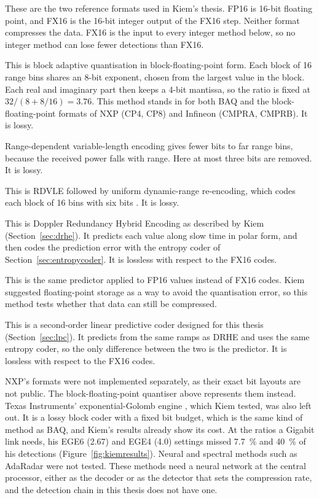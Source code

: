 \begin{description}[leftmargin=!,labelwidth=26mm,style=nextline,font=\normalfont\bfseries]
\item[FP16, FX16] These are the two reference formats used in Kiem's thesis.
FP16 is 16-bit floating point, and FX16 is the 16-bit integer output of the
FX16 step. Neither format compresses the data. FX16 is the input to every
integer method below, so no integer method can lose fewer detections than FX16.
\item[BAQ] This is block adaptive quantisation in block-floating-point form.
Each block of 16 range bins shares an 8-bit exponent, chosen from the largest
value in the block. Each real and imaginary part then keeps a 4-bit mantissa,
so the ratio is fixed at $32/(8 + 8/16) = 3.76$. This method stands in for
both BAQ \cite{kwok1989} and the block-floating-point formats of NXP (CP4,
CP8) and Infineon (CMPRA, CMPRB). It is lossy.
\item[RDVLE] Range-dependent variable-length encoding \cite{li2014} gives fewer
bits to far range bins, because the received power falls with range. Here at
most three bits are removed. It is lossy.
\item[RDVLE+UDRE] This is RDVLE followed by uniform dynamic-range re-encoding,
which codes each block of 16 bins with six bits \cite{li2014}. It is lossy.
\item[DRHE] This is Doppler Redundancy Hybrid Encoding as described by Kiem
(Section~\ref{sec:drhe}). It predicts each value along slow time in polar
form, and then codes the prediction error with the entropy coder of
Section~\ref{sec:entropycoder}. It is lossless with respect to the FX16 codes.
\item[DRHE fp16] This is the same predictor applied to FP16 values instead of
FX16 codes. Kiem suggested floating-point storage as a way to avoid the
quantisation error, so this method tests whether that data can still be
compressed.
\item[LPC] This is a second-order linear predictive coder designed for this
thesis (Section~\ref{sec:lpc}). It predicts from the same ramps as DRHE and
uses the same entropy coder, so the only difference between the two is the
predictor. It is lossless with respect to the FX16 codes.
\end{description}

\noindent
NXP's formats were not implemented separately, as their exact bit layouts are
not public. The block-floating-point quantiser above represents them instead.
Texas Instruments' exponential-Golomb engine \cite{ti_ege}, which Kiem tested,
was also left out. It is a lossy block coder with a fixed bit budget, which is
the same kind of method as BAQ, and Kiem's results already show its cost. At
the ratios a Gigabit link needs, his EGE6 (2.67) and EGE4 (4.0) settings missed
\SI{7.7}{\percent} and \SI{40}{\percent} of his detections
(Figure~\ref{fig:kiemresults}). Neural and spectral methods such as AdaRadar
\cite{park2026} were not tested. These methods need a neural network at the
central processor, either as the decoder or as the detector that sets the
compression rate, and the detection chain in this thesis does not have one.

